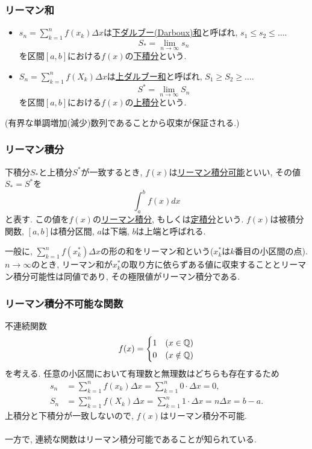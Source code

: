 \begin{frame}
\frametitle{リーマン和}

\begin{itemize}
\item $s_n=\sum_{k=1}^nf(x_k)\Delta x$は\underline{下ダルブー(Darboux)和}と呼ばれ, $s_1 \le s_2 \le \dots$. 
$$S_*=\lim_{n \to \infty} s_n$$
を区間$[a,b]$における$f(x)$の\underline{下積分}という. 
\item $S_n=\sum_{k=1}^nf(X_k)\Delta x$は\underline{上ダルブー和}と呼ばれ, $S_1 \ge S_2 \ge \dots$. 
$$S^*=\lim_{n \to \infty} S_n$$
を区間$[a,b]$における$f(x)$の\underline{上積分}という. 
\end{itemize}
(有界な単調増加(減少)数列であることから収束が保証される.)

\end{frame}





\begin{frame}
\frametitle{リーマン積分}


\begin{Def}
下積分$S_*$と上積分$S^*$が一致するとき, $f(x)$は\underline{リーマン積分可能}といい, その値$S_*=S^*$を
$$
\int_a^b f(x)dx
$$
と表す. この値を$f(x)$の\underline{リーマン積分}, もしくは\underline{定積分}という. 
$f(x)$は被積分関数, $[a,b]$は積分区間, $a$は下端, $b$は上端と呼ばれる. 
\end{Def}

一般に, $\sum_{k=1}^nf(x_k^*)\Delta x$の形の和をリーマン和という($x_k^*$は$k$番目の小区間の点). 
$n \to \infty$のとき, リーマン和が$x_k^*$の取り方に依らずある値に収束することとリーマン積分可能性は同値であり, 
その極限値がリーマン積分である.  

\end{frame}




\begin{frame}
\frametitle{リーマン積分不可能な関数}

不連続関数
$$
f(x)=
\begin{cases}
1 & (x \in \mathbb{Q})\\
0 & (x \notin \mathbb{Q})
\end{cases}
$$
を考える. 
任意の小区間において有理数と無理数はどちらも存在するため
\begin{align*}
s_n &= \sum_{k=1}^nf(x_k)\Delta x = \sum_{k=1}^n 0 \cdot \Delta x =0, \\
S_n &= \sum_{k=1}^nf(X_k)\Delta x = \sum_{k=1}^n 1 \cdot \Delta x =n \Delta x = b-a. 
\end{align*}
上積分と下積分が一致しないので, $f(x)$はリーマン積分不可能. \\
\ \\

一方で, 連続な関数はリーマン積分可能であることが知られている. 
\end{frame}



